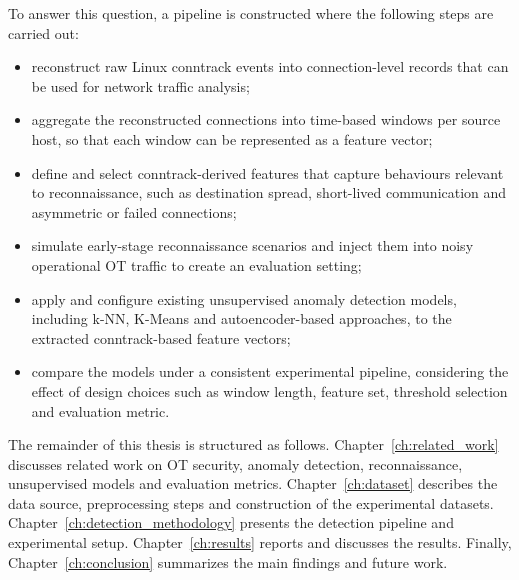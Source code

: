 \begin{center}
\setlength{\fboxsep}{8pt}
\end{center}



To answer this question, a pipeline is constructed where the following steps are carried out:

\begin{itemize}
    \item reconstruct raw Linux conntrack events into connection-level records that can be used for network traffic analysis;

    \item aggregate the reconstructed connections into time-based windows per source host, so that each window can be represented as a feature vector;

    \item define and select conntrack-derived features that capture behaviours relevant to reconnaissance, such as destination spread, short-lived communication and asymmetric or failed connections;

    \item simulate early-stage reconnaissance scenarios and inject them into noisy operational OT traffic to create an evaluation setting;

    \item apply and configure existing unsupervised anomaly detection models, including k-NN, K-Means and autoencoder-based approaches, to the extracted conntrack-based feature vectors;

    \item compare the models under a consistent experimental pipeline, considering the effect of design choices such as window length, feature set, threshold selection and evaluation metric.
\end{itemize}


The remainder of this thesis is structured as follows. Chapter~\ref{ch:related_work} discusses related work on OT security, anomaly detection, reconnaissance, unsupervised models and evaluation metrics. Chapter~\ref{ch:dataset} describes the data source, preprocessing steps and construction of the experimental datasets. Chapter~\ref{ch:detection_methodology} presents the detection pipeline and experimental setup. Chapter~\ref{ch:results} reports and discusses the results. Finally, Chapter~\ref{ch:conclusion} summarizes the main findings and future work.

